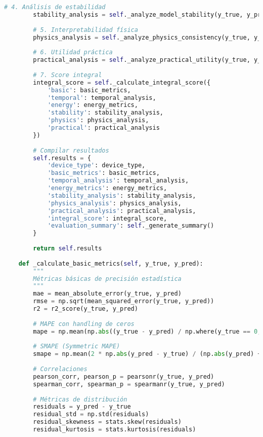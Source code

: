 \begin{lstlisting}[language=Python, caption=Framework integral de evaluación]
        # 4. Análisis de estabilidad
        stability_analysis = self._analyze_model_stability(y_true, y_pred)
        
        # 5. Interpretabilidad física
        physics_analysis = self._analyze_physics_consistency(y_true, y_pred)
        
        # 6. Utilidad práctica
        practical_analysis = self._analyze_practical_utility(y_true, y_pred, device_type)
        
        # 7. Score integral
        integral_score = self._calculate_integral_score({
            'basic': basic_metrics,
            'temporal': temporal_analysis,
            'energy': energy_metrics,
            'stability': stability_analysis,
            'physics': physics_analysis,
            'practical': practical_analysis
        })
        
        # Compilar resultados
        self.results = {
            'device_type': device_type,
            'basic_metrics': basic_metrics,
            'temporal_analysis': temporal_analysis,
            'energy_metrics': energy_metrics,
            'stability_analysis': stability_analysis,
            'physics_analysis': physics_analysis,
            'practical_analysis': practical_analysis,
            'integral_score': integral_score,
            'evaluation_summary': self._generate_summary()
        }
        
        return self.results
    
    def _calculate_basic_metrics(self, y_true, y_pred):
        """
        Métricas básicas de precisión estadística
        """
        mae = mean_absolute_error(y_true, y_pred)
        rmse = np.sqrt(mean_squared_error(y_true, y_pred))
        r2 = r2_score(y_true, y_pred)
        
        # MAPE con handling de ceros
        mape = np.mean(np.abs((y_true - y_pred) / np.where(y_true == 0, 1, y_true))) * 100
        
        # SMAPE (Symmetric MAPE)
        smape = np.mean(2 * np.abs(y_pred - y_true) / (np.abs(y_pred) + np.abs(y_true))) * 100
        
        # Correlaciones
        pearson_corr, pearson_p = pearsonr(y_true, y_pred)
        spearman_corr, spearman_p = spearmanr(y_true, y_pred)
        
        # Métricas de distribución
        residuals = y_pred - y_true
        residual_std = np.std(residuals)
        residual_skewness = stats.skew(residuals)
        residual_kurtosis = stats.kurtosis(residuals)
        

\end{lstlisting}
